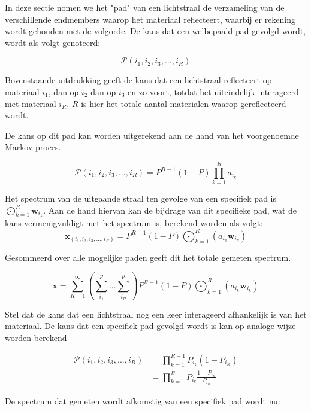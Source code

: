 \documentclass[12pt]{report}
\DeclareMathOperator*{\Odot}{\bigodot}
\begin{document}
In deze sectie nomen we het "pad" van een lichtstraal de verzameling van de verschillende endmembers waarop het materiaal reflecteert, waarbij er rekening wordt gehouden met de volgorde. De kans dat een welbepaald pad gevolgd wordt, wordt als volgt genoteerd:

\begin{equation}
\mathcal{P}(i_1,i_2,i_3,...,i_R)
\end{equation}

Bovenstaande uitdrukking geeft de kans dat een lichtstraal reflecteert op materiaal 
$i_1$, dan op $i_2$ dan op $i_3$ en zo voort, totdat het uiteindelijk interageerd met materiaal $i_R$. $R$ is hier het totale aantal materialen waarop gereflecteerd wordt.

De kans op dit pad kan worden uitgerekend aan de hand van het voorgenoemde Markov-proces\cite{mlinmix}. 

\begin{equation}
\mathcal{P}(i_1,i_2,i_3,...,i_R) = P^{R-1} (1-P) \prod_{k=1}^R a_{i_k}
\end{equation}

Het spectrum van de uitgaande straal ten gevolge van een specifiek pad is $\Odot_{k=1}^R \bm{w}_{i_k}$. Aan de hand hiervan kan de bijdrage van dit specifieke pad, wat de kans vermenigvuldigt met het spectrum is, berekend worden als volgt:
\begin{equation}
\bm{x}_{(i_1,i_2,i_3,...,i_R)} = P^{R-1} (1-P) \Odot_{k=1}^R \left(a_{i_k} \bm{w}_{i_k}\right)
\end{equation}

Gesommeerd over alle mogelijke paden geeft dit het totale gemeten spectrum. 

\begin{equation}
\bm{x} = \sum_{R=1}^{\infty} \left(\sum_{i_1}^{p} ... \sum_{i_R}^{p}\right)P^{R-1} (1-P) \Odot_{k=1}^R \left(a_{i_k} \bm{w}_{i_k}\right)
\end{equation}

Stel dat de kans dat een lichtstraal nog een keer interageerd afhankelijk is van het materiaal. De kans dat een specifiek pad gevolgd wordt is kan op analoge wijze worden berekend

\begin{align}
\mathcal{P}(i_1,i_2,i_3,...,i_R) &= \prod_{k=1}^{R-1}P_{i_k} (1-P_{i_R})\\
&= \prod_{k=1}^{R}P_{i_k} \frac{1-P_{i_R}}{P_{i_R}}
\end{align}

De spectrum dat gemeten wordt afkomstig van een specifiek pad wordt nu:
\end{document}
